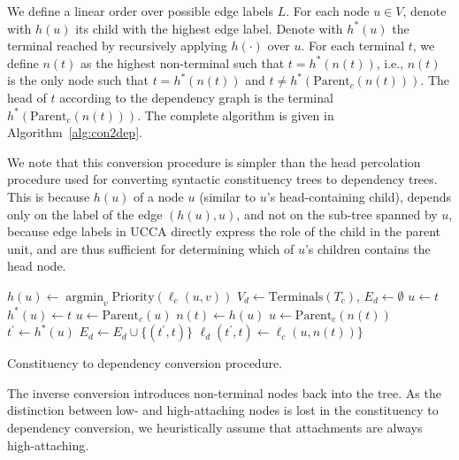 \documentclass[11pt]{article}
\DeclareMathOperator*{\argmin}{argmin}
\begin{document}
We define a linear order over possible edge labels $L$.
For each node $u \in V$, denote with $h(u)$ its child with the highest edge label.
Denote with $h^*(u)$ the terminal reached by recursively applying $h(\cdot)$ over $u$.
For each terminal $t$, we define $n(t)$ as the highest
non-terminal such that $t=h^*(n(t))$, i.e.,
$n(t)$ is the only node such that $t=h^*(n(t))$ and $t \neq h^*(\mathrm{Parent}_c(n(t)))$.
The head of $t$ according to the dependency graph is
the terminal $h^*(\mathrm{Parent}_c(n(t)))$.
The complete algorithm is given in Algorithm~\ref{alg:con2dep}.

We note that this conversion procedure is simpler than the
head percolation procedure used for converting syntactic constituency
trees to dependency trees.
This is because $h(u)$ of a node $u$ (similar to $u$'s head-containing child),
depends only on the label of the edge $(h(u),u)$, and not on the sub-tree spanned by $u$,
because edge labels in UCCA directly express the role of the child in the parent unit, and
are thus sufficient for determining which of $u$'s children contains the head node.

\begin{algorithm}[t]
  \small
  {
  $h(u) \leftarrow \argmin_v \mathrm{Priority}(\ell_c(u,v))$\;
 }
 $V_d \leftarrow \mathrm{Terminals}({T_c})$,
 $E_d \leftarrow \emptyset$\;
  {
  $u \leftarrow t$\;
   {
  	$h^*(u) \leftarrow t$\;
  	$u \leftarrow \mathrm{Parent}_c(u)$\;
  }
  $n(t) \leftarrow h(u)$\;
 }
  {
  $u \leftarrow \mathrm{Parent}_c(n(t))$\;
  $t^\prime \leftarrow h^*(u)$\;
  $E_d \leftarrow E_d \cup \{(t^\prime, t)\}$\;
  $\ell_d (t^\prime, t) \leftarrow \ell_c(u, n(t))\}$\;
 }
 \caption{\small Constituency to dependency conversion procedure.}
 \label{alg:con2dep}
\end{algorithm}

The inverse conversion introduces non-terminal nodes back into the tree.
As the distinction between low- and high-attaching nodes is lost in the constituency to
dependency conversion, we heuristically assume that attachments are always
high-attaching.
\end{document}
